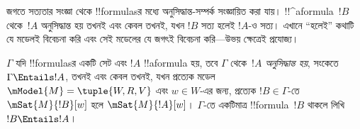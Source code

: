 \documentclass[../../../include/open-logic-section]{subfiles}
\begin{document}


\begin{explain}
  জগতে সত্যতার সংজ্ঞা থেকে !!{formula}sর মধ্যে অনুসিদ্ধান্ত-সম্পর্ক
  সংজ্ঞায়িত করা যায়। !!^a{formula}~$!B$ থেকে~$!A$ অনুসিদ্ধান্ত হয়
  তখনই এবং কেবল তখনই, যখন $!B$ সত্য হলেই $!A$-ও সত্য। এখানে
  ``হলেই'' কথাটি যে মডেলই বিবেচনা করি এবং সেই মডেলের যে জগৎই
  বিবেচনা করি—উভয় ক্ষেত্রেই প্রযোজ্য।
\end{explain}

\begin{defn}
  $\Gamma$ যদি !!{formula}sর একটি সেট এবং $!A$ !!a{formula} হয়,
  তবে $\Gamma$ থেকে~$!A$ \emph{অনুসিদ্ধান্ত হয়}, সংকেতে
  $\Gamma \Entails !A$, তখনই এবং কেবল তখনই, যখন প্রত্যেক মডেল
  $\mModel{M} = \tuple{W, R, V}$ এবং $w \in W$-এর জন্য,
  প্রত্যেক $!B \in \Gamma$-তে $\mSat{M}{!B}[w]$ হলে
  $\mSat{M}{!A}[w]$। $\Gamma$-তে একটিমাত্র !!{formula}~$!B$
  থাকলে লিখি $!B \Entails !A$।
\end{defn}
\end{document}
